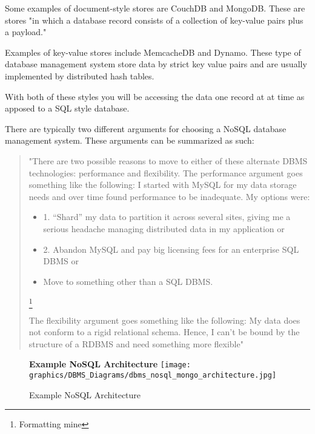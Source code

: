 \documentclass[letterpaper, 12pt]{article}
\renewcommand{\includegraphics}[2][]{\fbox{}}
\begin{document}
Some examples of document-style stores are CouchDB and MongoDB. These are stores 
"in which a database record consists of a collection of key-value pairs plus a payload."
\cite{stonebraker2010sql}
\par\vspace{\baselineskip}
Examples of key-value stores include MemcacheDB and Dynamo. These type of database 
management system store data by strict key value pairs and are usually implemented by 
distributed hash tables.
\par\vspace{\baselineskip}
With both of these styles you will be accessing the data one record at 
at time as apposed to a SQL style database.
\par\vspace{\baselineskip}
There are typically two different arguments for choosing a NoSQL database management 
system. These arguments can be summarized as such:

\begin{quote}
"There are two possible reasons
to move to either of these alternate
DBMS technologies: performance and
flexibility.
The performance argument goes
something like the following: I started
with MySQL for my data storage needs
and over time found performance to be
inadequate. My options were:

\begin{itemize}
  \item 1. “Shard” my data to partition it
across several sites, giving me a serious
headache managing distributed data
in my application or
  \item 2. Abandon MySQL and pay big licensing
fees for an enterprise SQL
DBMS or 
\item Move to something other
than a SQL DBMS.
\end{itemize}\footnote{Formatting mine}

The flexibility argument goes something
like the following: My data does
not conform to a rigid relational schema.
Hence, I can’t be bound by the
structure of a RDBMS and need something
more flexible"
\end{quote} \cite{stonebraker2010sql}

\begin{figure}
  \centering
  \textbf{Example NoSQL Architecture}
  \texttt{[image: graphics/DBMS\_Diagrams/dbms\_nosql\_mongo\_architecture.jpg]}
  \caption{Example NoSQL Architecture}
  \citep{mongodb_architecture}
\end{figure}
\end{document}
